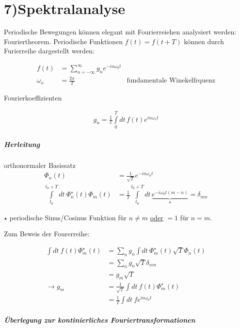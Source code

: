 \documentclass[a4paper,ngerman]{scrbook}
\begin{document}
\chapter{7)Spektralanalyse}

Periodische Bewegungen können elegant mit Fourierreiehen analysiert werden: Fouriertheorem. Periodische Funktionen $f(t) = f(t+T)$ können durch Furierreihe dargestellt werden:

\begin{align*}
  f(t) &= \sum_{n=-\infty}^\infty g_n e^{-in\omega_0 t}\\
  \omega_o &= \frac{2\pi}{T} &\text{fundamentale Winekelfrquenz}
\end{align*}

Fourierkoeffizienten

\begin{align*}
g_n = \frac{1}{T} \int\limits_0^T\! dt\, f(t) e^{in\omega_o t}
\end{align*}

\paragraph{Herleitung}

orthonormaler Basissatz
\begin{align*}
  \Phi_n(t) &= \frac{1}{\sqrt{T}} e^{-in\omega_o t}\\
  \int\limits_{t_0}^{t_0+T}\!dt\ \Phi_n^\star (t) \Phi_m(t) &= \frac{1}{T} \int\limits_{t_0}^{t_0+T}\! dt\, \underbrace{e^{-i\omega_0 t(m-n)}}_{\star} = \delta_{mn}
\end{align*}

$\star$ periodische Sinus/Cosinus Funktion für $n\neq m$ \underline{oder} $=1$ für $n=m$.

Zum Beweis der Fourerreihe:

\begin{align*}
  \int\! dt\ f(t) \Phi_m^\star (t) &= \sum_n g_n \int\! dt \ \Phi_m^\star (t) \sqrt{T} \Phi_n(t)\\
&= \sum_n g_n \sqrt{T} \delta_{nm}\\
&= g_m\sqrt{T}\\
\to g_m &=  \frac{1}{\sqrt{T}} \int\! dt\ f(t) \Phi_m^\star (t)\\
&= \frac{1}{T} \int\! dt\ f e^{in\omega_0 t}
\end{align*}

\paragraph{Überlegung zur kontinierliches Fouriertransformationen}
\end{document}
